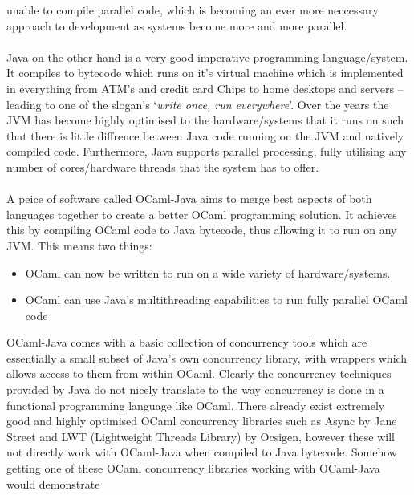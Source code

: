 \documentclass[12pt,twoside,notitlepage]{report}
\begin{document}
unable to compile parallel code, which is becoming an ever more neccessary approach to development as systems become more and more parallel.
\\
\\
%
%
Java on the other hand is a very good imperative programming language/system. It compiles to bytecode which runs on it's virtual machine which is implemented in everything from ATM's and credit card Chips to home desktops and servers -- leading to one of the slogan's  `{\em write once, run everywhere}'. Over the years the JVM has become highly optimised to the
hardware/systems that it runs on such that there is little diffrence between Java code running on the JVM and natively compiled code. Furthermore, Java supports parallel processing, fully utilising any number of cores/hardware threads
that the system has to offer.
\\
\\
%
%
A peice of software called OCaml-Java aims to merge best aspects of both languages together to create a better OCaml programming solution. It achieves this by compiling OCaml code to Java bytecode, thus allowing it to run on any JVM.
This means two things:
\begin{itemize}
\item OCaml can now be written to run on a wide variety of hardware/systems.
\item OCaml can use Java's multithreading capabilities to run fully parallel OCaml code\cite{clerc2012}
\end{itemize}
OCaml-Java comes with a basic collection of concurrency tools which are essentially a small subset of Java's own concurrency library, with wrappers which allows access to them from within OCaml. Clearly the concurrency techniques
provided by Java do not nicely translate to the way concurrency is done in a functional programming language like OCaml. There already exist extremely good and highly optimised OCaml concurrency libraries such as Async by Jane Street
and LWT (Lightweight Threads Library) by Ocsigen, however these will not directly work with OCaml-Java when compiled to Java bytecode. Somehow getting one of these OCaml concurrency libraries working with OCaml-Java would demonstrate
\end{document}
